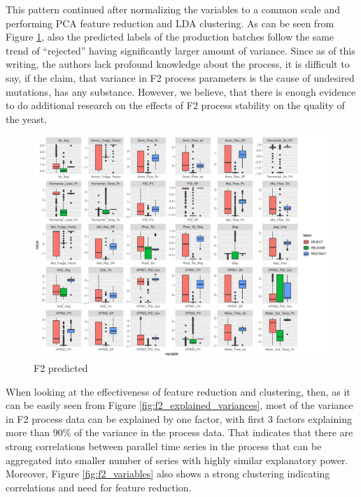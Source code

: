 This pattern continued after normalizing the variables to a common scale and performing PCA feature reduction and LDA clustering. As can be seen from Figure \ref{fig:f2_predicted}, also the predicted labels of the production batches follow the same trend of ``rejected'' having significantly larger amount of variance. Since as of this writing, the authors lack profound knowledge about the process, it is difficult to say, if the claim, that variance in F2 process parameters is the cause of undesired mutations, has any substance. However, we believe, that there is enough evidence to do additional research on the effects of F2 process stability on the quality of the yeast.

\begin{figure}[ht!]
    \centering
    \includegraphics[width=1.0\textwidth]{plots/f2-predicted.pdf}
    \caption{F2 predicted}
    \label{fig:f2_predicted}
\end{figure}

When looking at the effectiveness of feature reduction and clustering, then, as it can be easily seen from Figure \ref{fig:f2_explained_variances}, most of the variance in F2 process data can be explained by one factor, with first 3 factors explaining more than 90\% of the variance in the process data. That indicates that there are strong correlations between parallel time series in the process that can be aggregated into smaller number of series with highly similar explanatory power. Moreover, Figure \ref{fig:f2_variables} also shows a strong clustering indicating correlations and need for feature reduction.

